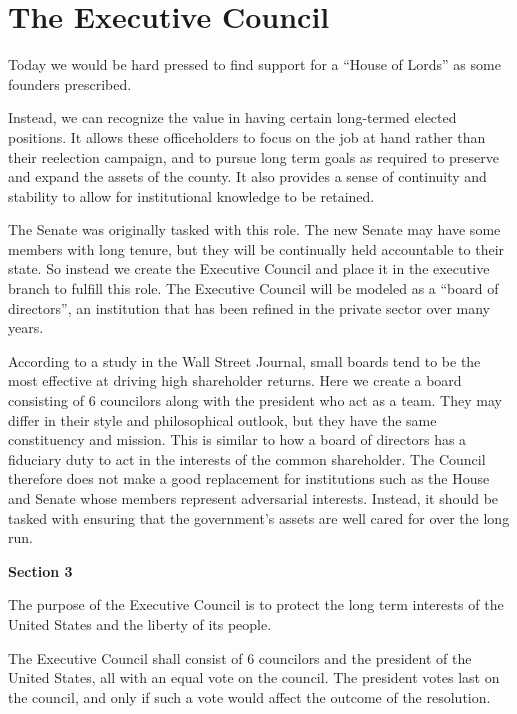 \documentclass{article}
\newcommand{\quotes}[1]{``#1''}
\begin{document}
\section{The Executive Council}

Today we would be hard pressed to find support for a \quotes{House of Lords} as some founders prescribed.

Instead, we can recognize the value in having certain long-termed elected positions. It allows these officeholders to focus on the job at hand rather than their reelection campaign, and to pursue long term goals as required to preserve and expand the assets of the county. It also provides a sense of continuity and stability to allow for institutional knowledge to be retained.

The Senate was originally tasked with this role. The new Senate may have some members with long tenure, but they will be continually held accountable to their state. So instead we create the Executive Council and place it in the executive branch to fulfill this role. The Executive Council will be modeled as a \quotes{board of directors}, an institution that has been refined in the private sector over many years.

According to a study in the Wall Street Journal, small boards tend to be the most effective at driving high shareholder returns\cite{Lublin}. Here we create a board consisting of 6 councilors along with the president who act as a team. They may differ in their style and philosophical outlook, but they have the same constituency and mission. This is similar to how a board of directors has a fiduciary duty to act in the interests of the common shareholder. The Council therefore does not make a good replacement for institutions such as the House and Senate whose members represent adversarial interests. Instead, it should be tasked with ensuring that the government's assets are well cared for over the long run.

\begin{quoting}
\textbf{Section 3}

The purpose of the Executive Council is to protect the long term interests of the United States and the liberty of its people.

The Executive Council shall consist of 6 councilors and the president of the United States, all with an equal vote on the council. The president votes last on the council, and only if such a vote would affect the outcome of the resolution.
\end{quoting}
\end{document}
